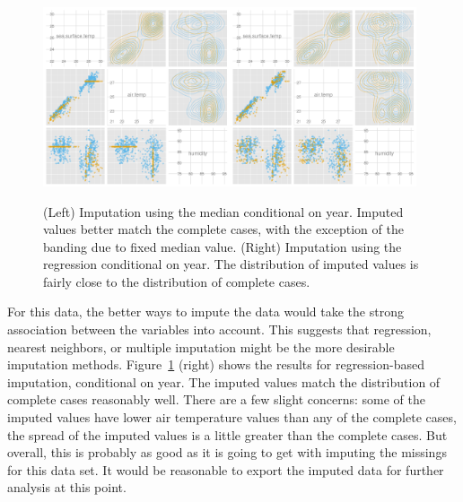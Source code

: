\documentclass[article]{jss}
\begin{document}
\begin{figure}[htp]
\centerline{\includegraphics[width=0.49\textwidth]{graph/fig4-2-median-condition}\includegraphics[width=0.49\textwidth]{graph/fig4-4-areg-condition}}
\caption{(Left) Imputation using the median conditional on year. Imputed values better match the complete cases, with the exception of the banding due to fixed median value. (Right) Imputation using the regression conditional on year. The distribution of imputed values is fairly close to the distribution of complete cases.}
\label{tao3}
\end{figure}

For this data, the better ways to impute the data would take the strong association between the variables into account. This suggests that regression, nearest neighbors, or multiple imputation might be the more desirable imputation methods. Figure~\ref{tao3} (right) shows the results for regression-based imputation, conditional on year. The imputed values match the distribution of complete cases reasonably well. There are a few slight concerns: some of the imputed values have lower air temperature values than any of the complete cases, the spread of the imputed values is a little greater than the complete cases. But overall, this is probably as good as it is going to get with imputing the missings for this data set. It would be reasonable to export the imputed data for further analysis at this point.
\end{document}
